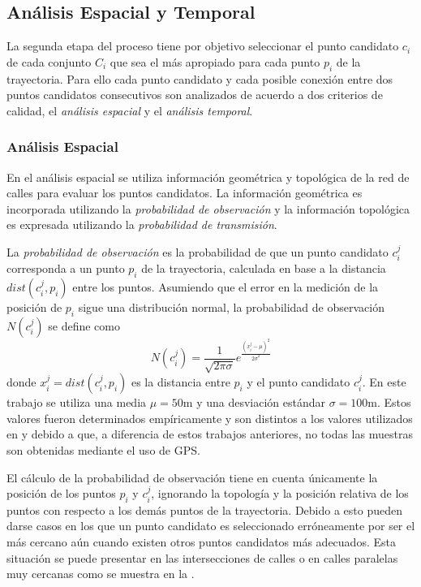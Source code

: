 \subsection{Análisis Espacial y Temporal}

La segunda etapa del proceso tiene por objetivo seleccionar el punto candidato $c_i$ de cada conjunto $C_i$ que sea el más apropiado para cada punto $p_i$ de la trayectoria. Para ello cada punto candidato y cada posible conexión entre dos puntos candidatos consecutivos son analizados de acuerdo a dos criterios de calidad, el \emph{análisis espacial} y el \emph{análisis temporal}.

\subsubsection{Análisis Espacial}

En el análisis espacial se utiliza información geométrica y topológica de la red de calles para evaluar los puntos candidatos. La información geométrica es incorporada utilizando la \emph{probabilidad de observación} y la información topológica es expresada utilizando la \emph{probabilidad de transmisión}.

La \emph{probabilidad de observación} es la probabilidad de que un punto candidato $c_{i}^{j}$ corresponda a un punto $p_i$ de la trayectoria, calculada en base a la distancia $dist(c_{i}^{j},p_i)$ entre los puntos. Asumiendo que el error en la medición de la posición de $p_i$ sigue una distribución normal, la probabilidad de observación $N(c_{i}^{j})$ se define como
\begin{equation} \label{probabilidad_de_observacion}
N(c_{i}^{j}) = \frac {1}{\sqrt { 2 \pi \sigma }} {e}^{\frac {{(x_{i}^{j} - \mu)}^{2}}{{ 2 \sigma}^{2}}}
\end{equation}
donde $x_{i}^{j} = dist(c_{i}^{j},p_i)$ es la distancia entre $p_i$ y el punto candidato $c_{i}^{j}$. En este trabajo se utiliza una media $\mu = 50\text{m}$ y una desviación estándar $\sigma = 100\text{m}$. Estos valores fueron determinados empíricamente y son distintos a los valores utilizados en \citep{lou2009map} y \citep{budigm2012algorithm} debido a que, a diferencia de estos trabajos anteriores, no todas las muestras son obtenidas mediante el uso de GPS.

El cálculo de la probabilidad de observación tiene en cuenta únicamente la posición de los puntos $p_i$ y $c_{i}^{j}$, ignorando la topología y la posición relativa de los puntos con respecto a los demás puntos de la trayectoria. Debido a esto pueden darse casos en los que un punto candidato es seleccionado erróneamente por ser el más cercano aún cuando existen otros puntos candidatos más adecuados. Esta situación se puede presentar en las intersecciones de calles o en calles paralelas muy cercanas como se muestra en la .

